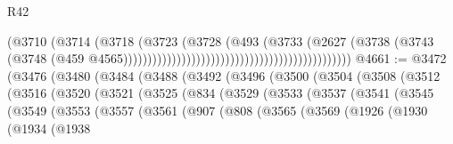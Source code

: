 \begin{lexlean}{R42}
\begin{coremodule}
                                                                          (@3710
                                                                            (@3714
                                                                              (@3718
                                                                                (@3723
                                                                                  (@3728
                                                                                    (@493
                                                                                      (@3733
                                                                                        (@2627
                                                                                          (@3738
                                                                                            (@3743
                                                                                              (@3748
                                                                                                (@459
                                                                                                  @4565)))))))))))))))))))))))))))))))))))))))))))))))
@4661 := @3472
    (@3476
      (@3480
        (@3484
          (@3488
            (@3492
              (@3496
                (@3500
                  (@3504
                    (@3508
                      (@3512
                        (@3516
                          (@3520
                            (@3521
                              (@3525
                                (@834
                                  (@3529
                                    (@3533
                                      (@3537
                                        (@3541
                                          (@3545
                                            (@3549
                                              (@3553
                                                (@3557
                                                  (@3561
                                                    (@907
                                                      (@808
                                                        (@3565
                                                          (@3569
                                                            (@1926
                                                              (@1930
                                                                (@1934
                                                                  (@1938

\end{coremodule}
\end{lexlean}
